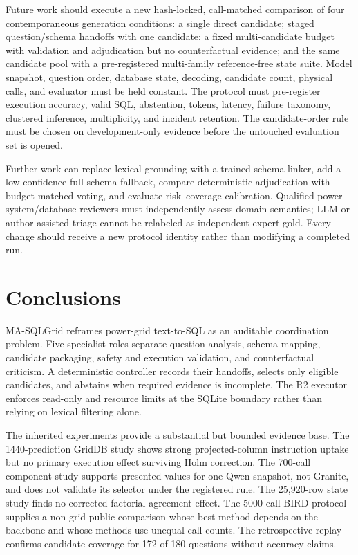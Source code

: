 \documentclass[applsci,article,submit,moreauthors]{Definitions/mdpi}
\newcommand{\masql}{MA-SQLGrid}
\begin{document}
Future work should execute a new hash-locked, call-matched comparison of four contemporaneous generation conditions: a single direct candidate; staged question/schema handoffs with one candidate; a fixed multi-candidate budget with validation and adjudication but no counterfactual evidence; and the same candidate pool with a pre-registered multi-family reference-free state suite. Model snapshot, question order, database state, decoding, candidate count, physical calls, and evaluator must be held constant. The protocol must pre-register execution accuracy, valid SQL, abstention, tokens, latency, failure taxonomy, clustered inference, multiplicity, and incident retention. The candidate-order rule must be chosen on development-only evidence before the untouched evaluation set is opened.

Further work can replace lexical grounding with a trained schema linker, add a low-confidence full-schema fallback, compare deterministic adjudication with budget-matched voting, and evaluate risk--coverage calibration. Qualified power-system/database reviewers must independently assess domain semantics; LLM or author-assisted triage cannot be relabeled as independent expert gold. Every change should receive a new protocol identity rather than modifying a completed run.

\section{Conclusions}

\masql{} reframes power-grid text-to-SQL as an auditable coordination problem. Five specialist roles separate question analysis, schema mapping, candidate packaging, safety and execution validation, and counterfactual criticism. A deterministic controller records their handoffs, selects only eligible candidates, and abstains when required evidence is incomplete. The R2 executor enforces read-only and resource limits at the SQLite boundary rather than relying on lexical filtering alone.

The inherited experiments provide a substantial but bounded evidence base. The 1440-prediction GridDB study shows strong projected-column instruction uptake but no primary execution effect surviving Holm correction. The 700-call component study supports presented values for one Qwen snapshot, not Granite, and does not validate its selector under the registered rule. The 25,920-row state study finds no corrected factorial agreement effect. The 5000-call BIRD protocol supplies a non-grid public comparison whose best method depends on the backbone and whose methods use unequal call counts. The retrospective replay confirms candidate coverage for 172 of 180 questions without accuracy claims.
\end{document}
